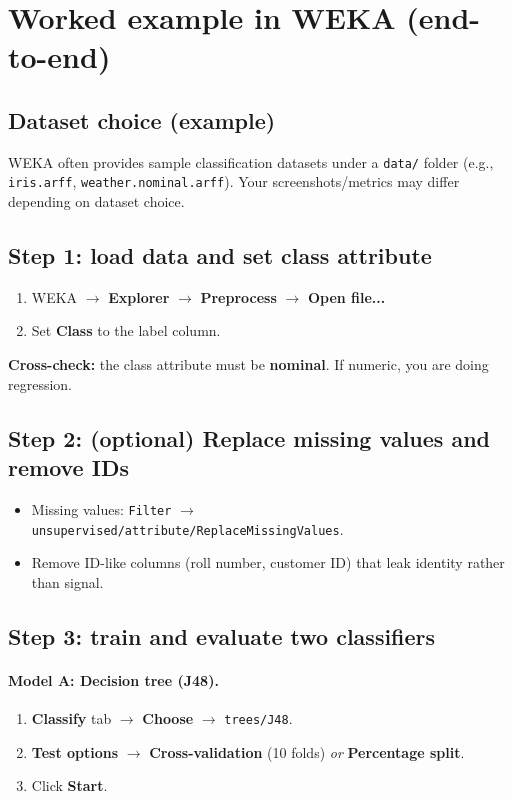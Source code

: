 \documentclass[11pt]{article}
\begin{document}
\section{Worked example in WEKA (end-to-end)}
\subsection{Dataset choice (example)}
WEKA often provides sample classification datasets under a \texttt{data/} folder (e.g., \texttt{iris.arff}, \texttt{weather.nominal.arff}).
Your screenshots/metrics may differ depending on dataset choice.

\subsection{Step 1: load data and set class attribute}
\begin{enumerate}[leftmargin=*]
  \item WEKA $\rightarrow$ \textbf{Explorer} $\rightarrow$ \textbf{Preprocess} $\rightarrow$ \textbf{Open file...}
  \item Set \textbf{Class} to the label column.
\end{enumerate}
\textbf{Cross-check:} the class attribute must be \textbf{nominal}. If numeric, you are doing regression.

\subsection{Step 2: (optional) Replace missing values and remove IDs}
\begin{itemize}[leftmargin=*]
  \item Missing values: \texttt{Filter} $\rightarrow$ \texttt{unsupervised/attribute/ReplaceMissingValues}.
  \item Remove ID-like columns (roll number, customer ID) that leak identity rather than signal.
\end{itemize}

\subsection{Step 3: train and evaluate two classifiers}
\paragraph{Model A: Decision tree (J48).}
\begin{enumerate}[leftmargin=*]
  \item \textbf{Classify} tab $\rightarrow$ \textbf{Choose} $\rightarrow$ \texttt{trees/J48}.
  \item \textbf{Test options} $\rightarrow$ \textbf{Cross-validation} (10 folds) \emph{or} \textbf{Percentage split}.
  \item Click \textbf{Start}.
\end{enumerate}
\end{document}
